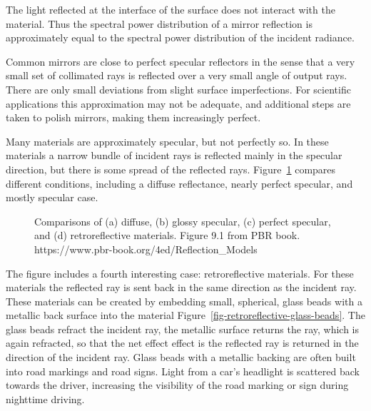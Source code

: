 \documentclass[
  letterpaper,
]{book}
\begin{document}
The light reflected at the interface of the surface does not interact
with the material. Thus the spectral power distribution of a mirror
reflection is approximately equal to the spectral power distribution of
the incident radiance.

Common mirrors are close to perfect specular reflectors in the sense
that a very small set of collimated rays is reflected over a very small
angle of output rays. There are only small deviations from slight
surface imperfections. For scientific applications this approximation
may not be adequate, and additional steps are taken to polish mirrors,
making them increasingly perfect.

Many materials are approximately specular, but not perfectly so. In
these materials a narrow bundle of incident rays is reflected mainly in
the specular direction, but there is some spread of the reflected rays.
Figure~\ref{fig-specular-diffuse-retro} compares different conditions,
including a diffuse reflectance, nearly perfect specular, and mostly
specular case.

\begin{figure}


\caption{\label{fig-specular-diffuse-retro}Comparisons of (a) diffuse,
(b) glossy specular, (c) perfect specular, and (d) retroreflective
materials. Figure 9.1 from PBR book.
https://www.pbr-book.org/4ed/Reflection\_Models}

\end{figure}%

The figure includes a fourth interesting case: retroreflective
materials. For these materials the reflected ray is sent back in the
same direction as the incident ray. These materials can be created by
embedding small, spherical, glass beads with a metallic back surface
into the material Figure~\ref{fig-retroreflective-glass-beads}. The
glass beads refract the incident ray, the metallic surface returns the
ray, which is again refracted, so that the net effect effect is the
reflected ray is returned in the direction of the incident ray. Glass
beads with a metallic backing are often built into road markings and
road signs. Light from a car's headlight is scattered back towards the
driver, increasing the visibility of the road marking or sign during
nighttime driving.
\end{document}
